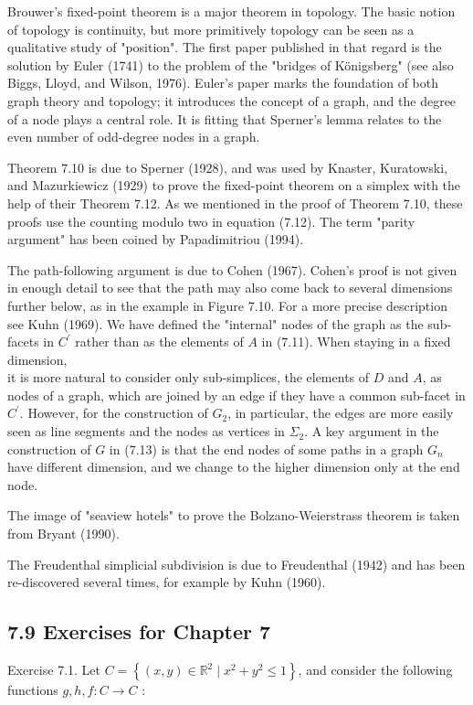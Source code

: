 \documentclass[12pt]{article}
\begin{document}
Brouwer's fixed-point theorem is a major theorem in topology. The basic notion of topology is continuity, but more primitively topology can be seen as a qualitative study of "position". The first paper published in that regard is the solution by Euler (1741) to the problem of the "bridges of Königsberg" (see also Biggs, Lloyd, and Wilson, 1976). Euler's paper marks the foundation of both graph theory and topology; it introduces the concept of a graph, and the degree of a node plays a central role. It is fitting that Sperner's lemma relates to the even number of odd-degree nodes in a graph.

Theorem 7.10 is due to Sperner (1928), and was used by Knaster, Kuratowski, and Mazurkiewicz (1929) to prove the fixed-point theorem on a simplex with the help of their Theorem 7.12. As we mentioned in the proof of Theorem 7.10, these proofs use the counting modulo two in equation (7.12). The term "parity argument" has been coined by Papadimitriou (1994).

The path-following argument is due to Cohen (1967). Cohen's proof is not given in enough detail to see that the path may also come back to several dimensions further below, as in the example in Figure 7.10. For a more precise description see Kuhn (1969). We have defined the "internal" nodes of the graph as the sub-facets in $C^{\prime}$ rather than as the elements of $A$ in (7.11). When staying in a fixed dimension,\\
it is more natural to consider only sub-simplices, the elements of $D$ and $A$, as nodes of a graph, which are joined by an edge if they have a common sub-facet in $C^{\prime}$. However, for the construction of $G_{2}$, in particular, the edges are more easily seen as line segments and the nodes as vertices in $\Sigma_{2}$. A key argument in the construction of $G$ in (7.13) is that the end nodes of some paths in a graph $G_{n}$ have different dimension, and we change to the higher dimension only at the end node.

The image of "seaview hotels" to prove the Bolzano-Weierstrass theorem is taken from Bryant (1990).

The Freudenthal simplicial subdivision is due to Freudenthal (1942) and has been re-discovered several times, for example by Kuhn (1960).

\subsection*{7.9 Exercises for Chapter 7}
Exercise 7.1. Let $C=\left\{(x, y) \in \mathbb{R}^{2} \mid x^{2}+y^{2} \leq 1\right\}$, and consider the following functions $g, h, f: C \rightarrow C$ :
\end{document}
